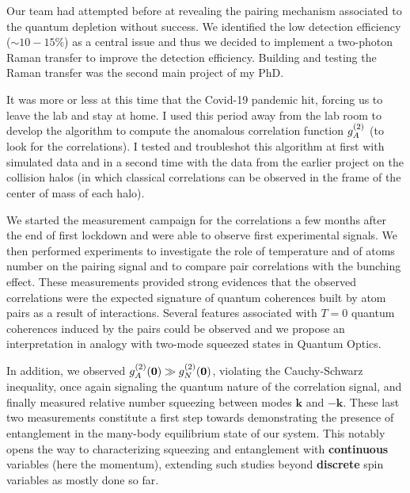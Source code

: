 Our team had attempted before at revealing the pairing mechanism associated to the quantum depletion without success. We identified the low detection efficiency ($\sim 10-15 \%$) as a central issue and thus we decided to implement a two-photon Raman transfer to improve the detection efficiency. Building and testing the Raman transfer was the second main project of my PhD. 

It was more or less at this time that the Covid-19 pandemic hit, forcing us to leave the lab and stay at home. I used this period away from the lab room to develop the algorithm to compute the anomalous correlation function $g^{(2)}_A$ (to look for the \kmk correlations). I tested and troubleshot this algorithm at first with simulated data and in a second time with the data from the earlier project on the collision halos (in which classical \kmk correlations can be observed in the frame of the center of mass of each halo). 

We started the measurement campaign for the \kmk correlations a few months after the end of first lockdown and were able to observe first experimental signals. We then performed experiments to investigate the role of temperature and of atoms number on the pairing signal and to compare pair correlations with the bunching effect. These measurements provided strong evidences that the observed \kmk correlations were the expected signature of quantum coherences built by atom pairs as a result of interactions. Several features associated with $T=0$ quantum coherences induced by the pairs could be observed and we propose an interpretation in analogy with two-mode squeezed states in Quantum Optics. 

In addition, we observed $g^{(2)}_A (\bm{0}) \gg g^{(2)}_N (\bm{0})$, violating the Cauchy-Schwarz inequality, once again signaling the quantum nature of the correlation signal, and finally measured relative number squeezing between modes $\bm{k}$ and $-\bm{k}$. These last two measurements constitute a first step towards demonstrating the presence of entanglement in the many-body equilibrium state of our system. This notably opens the way to characterizing squeezing and entanglement with \textbf{continuous} variables (here the momentum), extending such studies beyond \textbf{discrete} spin variables as mostly done so far.

